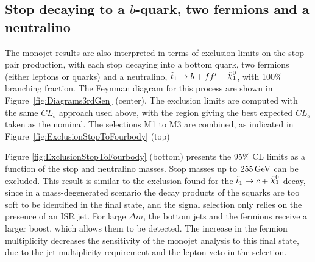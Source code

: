 \subsection{Stop decaying to a $b$-quark, two fermions and a neutralino}

The monojet results are also interpreted in terms of exclusion limits on the stop pair production, with each stop decaying into a bottom quark, two fermions (either leptons or quarks) and a neutralino, $\stopfourbody$, with 100\% branching fraction.
The Feynman diagram for this process are shown in Figure~\ref{fig:Diagrams3rdGen} (center).
The exclusion limits are computed with the same $CL_s$ approach used above, with the region giving the best expected $CL_s$ taken as the nominal.
The selections M1 to M3 are combined, as indicated in Figure~\ref{fig:ExclusionStopToFourbody} (top)

Figure \ref{fig:ExclusionStopToFourbody} (bottom) presents the 95\% CL limits as a function of the stop and neutralino masses.
Stop masses up to $\unit[255]{GeV}$ can be excluded.
This result is similar to the exclusion found for the $\stoptocharm$ decay, since in a mass-degenerated scenario the decay products of the squarks are too soft to be identified in the final state, and the signal selection only relies on the presence of an ISR jet.
For large $\Delta m$, the bottom jets and the fermions receive a larger boost, which allows them to be detected.
The increase in the fermion multiplicity decreases the sensitivity of the monojet analysis to this final state, due to the jet multiplicity requirement and the lepton veto in the selection.

